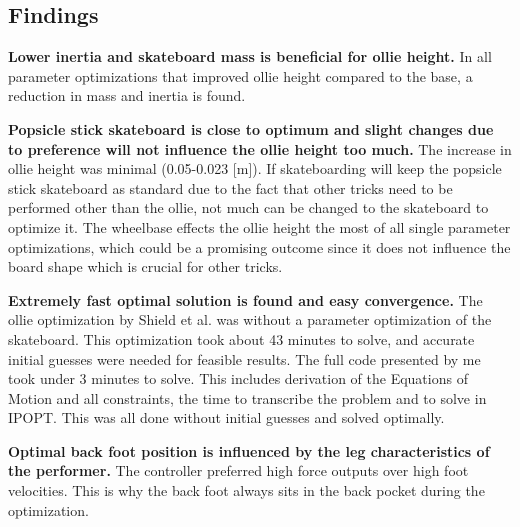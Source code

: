 \documentclass[default,iicol]{sn-jnl}
\begin{document}
\subsection{Findings}
\noindent\textbf{Lower inertia and skateboard mass is beneficial for ollie height.} In all parameter optimizations that improved ollie height compared to the base, a reduction in mass and inertia is found.

\noindent\textbf{Popsicle stick skateboard is close to optimum and slight changes due to preference will not influence the ollie height too much.} The increase in ollie height was minimal (0.05-0.023 [m]). If skateboarding will keep the popsicle stick skateboard as standard due to the fact that other tricks need to be performed other than the ollie, not much can be changed to the skateboard to optimize it. The wheelbase effects the ollie height the most of all single parameter optimizations, which could be a promising outcome since it does not influence the board shape which is crucial for other tricks. 

\noindent\textbf{Extremely fast optimal solution is found and easy convergence.} The ollie optimization by Shield et al. \cite{shield_contact-implicit_2022} was without a parameter optimization of the skateboard. This optimization took about 43 minutes to solve, and accurate initial guesses were needed for feasible results. The full code presented by me took under 3 minutes to solve. This includes derivation of the Equations of Motion and all constraints, the time to transcribe the problem and to solve in IPOPT. This was all done without initial guesses and solved optimally.

\noindent\textbf{Optimal back foot position is influenced by the leg characteristics of the performer.} The controller preferred high force outputs over high foot velocities. This is why the back foot always sits in the back pocket during the optimization.
\end{document}
